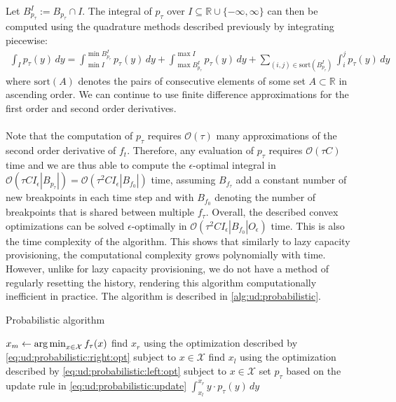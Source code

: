 Let $B_{p_{\tau}}^I := B_{p_{\tau}} \cap I$. The integral of $p_{\tau}$ over $I \subseteq \mathbb{R} \cup \{-\infty, \infty\}$ can then be computed using the quadrature methods described previously by integrating piecewise: \begin{align*}
    \int_I p_{\tau}(y) \,dy = \int_{\min I}^{\min B_{p_{\tau}}^I} p_{\tau}(y) \,dy + \int_{\max B_{p_{\tau}}^I}^{\max I} p_{\tau}(y) \,dy + \sum_{(i, j) \in \text{sort}(B_{p_{\tau}}^I)} \int_i^j p_{\tau}(y) \,dy
\end{align*} where $\text{sort}(A)$ denotes the pairs of consecutive elements of some set $A \subset \mathbb{R}$ in ascending order. We can continue to use finite difference approximations for the first order and second order derivatives.

\paragraph{} Note that the computation of $p_{\tau}$ requires $\mathcal{O}(\tau)$ many approximations of the second order derivative of $f_{t}$. Therefore, any evaluation of $p_{\tau}$ requires $\mathcal{O}(\tau C)$ time and we are thus able to compute the $\epsilon$-optimal integral in $\mathcal{O}(\tau C I_{\epsilon} |B_{p_{\tau}}|) = \mathcal{O}(\tau^2 C I_{\epsilon} |B_{f_0}|)$ time, assuming $B_{f_{\tau}}$ add a constant number of new breakpoints in each time step and with $B_{f_0}$ denoting the number of breakpoints that is shared between multiple $f_{\tau}$. Overall, the described convex optimizations can be solved $\epsilon$-optimally in $\mathcal{O}(\tau^2 C I_{\epsilon} |B_{f_0}| O_{\epsilon})$ time. This is also the time complexity of the algorithm. This shows that similarly to lazy capacity provisioning, the computational complexity grows polynomially with time. However, unlike for lazy capacity provisioning, we do not have a method of regularly resetting the history, rendering this algorithm computationally inefficient in practice. The algorithm is described in \autoref{alg:ud:probabilistic}.

\begin{algorithm}
    \caption{Probabilistic algorithm \cite{Bansal2015}}\label{alg:ud:probabilistic}
    $x_m \gets \operatorname*{arg\,min}_{x \in \mathcal{X}} f_{\tau}(x)$\;
    find $x_r$ using the optimization described by \autoref{eq:ud:probabilistic:right:opt} subject to $x \in \mathcal{X}$\;
    find $x_l$ using the optimization described by \autoref{eq:ud:probabilistic:left:opt} subject to $x \in \mathcal{X}$\;
    set $p_{\tau}$ based on the update rule in \autoref{eq:ud:probabilistic:update}\;
    \Return $\int_{x_l}^{x_r} y \cdot p_{\tau}(y) \,dy$\;
\end{algorithm}


